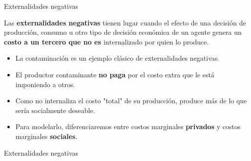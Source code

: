 \documentclass{beamer}
\begin{document}
\begin{frame}{Externalidades negativas}
    \begin{boxB}
        \centering
        Las \textbf{externalidades negativas} tienen lugar cuando el efecto de una decisión de producción, consumo u otro tipo de decisión económica de un agente genera un \textbf{costo a un tercero que no es
        $\underline{\text{internalizado}}$} por quien lo produce.
    \end{boxB}
    \begin{itemize}
        \item La contaminación es un ejemplo clásico de externalidades negativas.
        \item El productor contaminante \textbf{no paga} por el costo extra que le está imponiendo a otros.
        \item Como no internaliza el costo "total" de su producción, produce más de lo que sería socialmente deseable.
        \item Para modelarlo, diferenciaremos entre costos marginales \textbf{privados} y costos marginales \textbf{sociales}.
    \end{itemize}
\end{frame}


\begin{frame}{Externalidades negativas}
    \begin{figure} [H]
\centering
{}
\end{figure} 
\end{frame}
\end{document}
